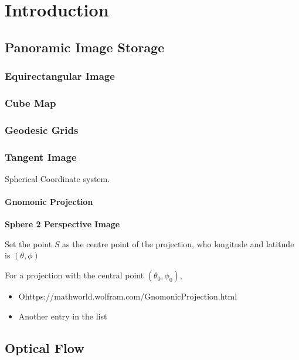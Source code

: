 

\chapter{Introduction}



\section{Panoramic Image Storage}


\subsection{Equirectangular Image}


\subsection{Cube Map}


\subsection{Geodesic Grids}



\subsection{Tangent Image}


Spherical Coordinate system.



\subsubsection{Gnomonic Projection}

\textbf{Sphere 2 Perspective Image}

Set the point $S$ as the centre point of the projection, who longitude and latitude is $(\theta, \phi)$

For a projection with the central point $(\theta_0, \phi_0)$,



\begin{itemize}
	\item Ohttps://mathworld.wolfram.com/GnomonicProjection.html
	\item Another entry in the list
\end{itemize}


\section{Optical Flow}

